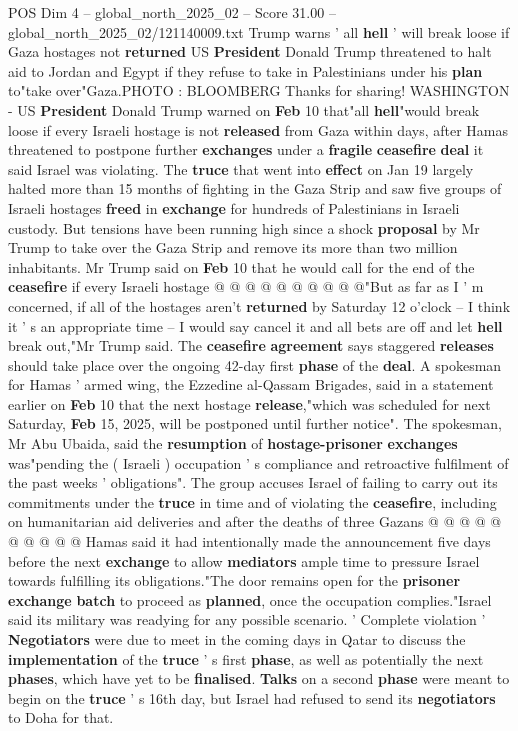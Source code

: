 \begin{textsample}{POS Dim 4 – global\_north\_2025\_02 – Score 31.00 – global\_north\_2025\_02/121140009.txt}  \label{ex:f4_pos_059}
Trump warns ' all \textbf{hell} ' will break loose if Gaza hostages not \textbf{returned} US \textbf{President} Donald Trump threatened to halt aid to Jordan and Egypt if they refuse to take in Palestinians under his \textbf{plan} to"take over"Gaza.PHOTO : BLOOMBERG Thanks for sharing!
WASHINGTON - US \textbf{President} Donald Trump warned on \textbf{Feb} 10 that"all \textbf{hell}"would break loose if every Israeli hostage is not \textbf{released} from Gaza within days, after Hamas threatened to postpone further \textbf{exchanges} under a \textbf{fragile} \textbf{ceasefire} \textbf{deal} it said Israel was violating.
The \textbf{truce} that went into \textbf{effect} on Jan 19 largely halted more than 15 months of fighting in the Gaza Strip and saw five groups of Israeli hostages \textbf{freed} in \textbf{exchange} for hundreds of Palestinians in Israeli custody.
But tensions have been running high since a shock \textbf{proposal} by Mr Trump to take over the Gaza Strip and remove its more than two million inhabitants.
Mr Trump said on \textbf{Feb} 10 that he would call for the end of the \textbf{ceasefire} if every Israeli hostage @ @ @ @ @ @ @ @ @ @"But as far as I ' m concerned, if all of the hostages aren't \textbf{returned} by Saturday 12 o'clock -- I think it ' s an appropriate time -- I would say cancel it and all bets are off and let \textbf{hell} break out,"Mr Trump said.
The \textbf{ceasefire} \textbf{agreement} says staggered \textbf{releases} should take place over the ongoing 42-day first \textbf{phase} of the \textbf{deal}.
A spokesman for Hamas ' armed wing, the Ezzedine al-Qassam Brigades, said in a statement earlier on \textbf{Feb} 10 that the next hostage \textbf{release},"which was scheduled for next Saturday, \textbf{Feb} 15, 2025, will be postponed until further notice".
The spokesman, Mr Abu Ubaida, said the \textbf{resumption} of \textbf{hostage-prisoner} \textbf{exchanges} was"pending the ( Israeli ) occupation ' s compliance and retroactive fulfilment of the past weeks ' obligations".
The group accuses Israel of failing to carry out its commitments under the \textbf{truce} in time and of violating the \textbf{ceasefire}, including on humanitarian aid deliveries and after the deaths of three Gazans @ @ @ @ @ @ @ @ @ @ Hamas said it had intentionally made the announcement five days before the next \textbf{exchange} to allow \textbf{mediators} ample time to pressure Israel towards fulfilling its obligations."The door remains open for the \textbf{prisoner} \textbf{exchange} \textbf{batch} to proceed as \textbf{planned}, once the occupation complies."Israel said its military was readying for any possible scenario. ' Complete violation ' \textbf{Negotiators} were due to meet in the coming days in Qatar to discuss the \textbf{implementation} of the \textbf{truce} ' s first \textbf{phase}, as well as potentially the next \textbf{phases}, which have yet to be \textbf{finalised}. \textbf{Talks} on a second \textbf{phase} were meant to begin on the \textbf{truce} ' s 16th day, but Israel had refused to send its \textbf{negotiators} to Doha for that.

\end{textsample}

